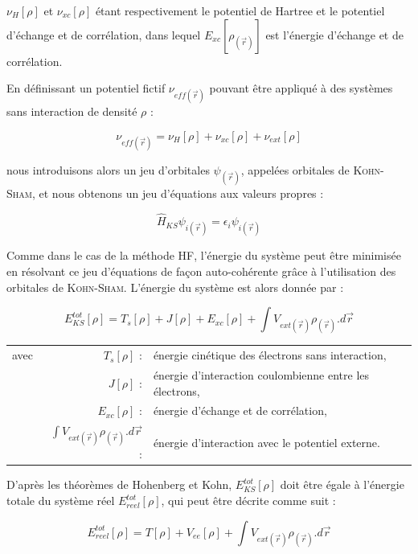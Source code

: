 \noindent $\nu_{H}[\rho]$ et $\nu_{xc}[\rho]$ étant respectivement le potentiel de Hartree et le potentiel d'échange et de corrélation, dans lequel $E_{xc}[\rho_{(\vec{r})}]$ est l'énergie d'échange et de corrélation.

En définissant un potentiel fictif $\nu_{eff(\vec{r})}$ pouvant être appliqué à des systèmes sans interaction de densité $\rho$ :

\begin{equation}
\nu_{eff(\vec{r})} = \nu_{H}[\rho] + \nu_{xc}[\rho] + \nu_{ext}[\rho]
\end{equation}

\noindent nous introduisons alors un jeu d'orbitales $\psi_{(\vec{r})}$, appelées orbitales de \textsc{Kohn-Sham}, et nous obtenons un jeu d'équations aux valeurs propres :

\begin{equation}
\hat{H}_{KS} \psi_{i(\vec{r})} = \epsilon_{i} \psi_{i(\vec{r})}
\end{equation}

Comme dans le cas de la méthode HF, l'énergie du système peut être minimisée en résolvant ce jeu d'équations de façon auto-cohérente grâce à l'utilisation des orbitales de \textsc{Kohn-Sham}. L'énergie du système est alors donnée par :

\begin{equation}
E_{KS}^{tot}[\rho] = T_{s}[\rho] + J[\rho] + E_{xc}[\rho] + \int V_{ext(\vec{r})}\rho_{(\vec{r})} .d\vec{r}
\end{equation}

\begin{flushleft}
\begin{tabular}{@{}lrp{10cm}}
avec & $T_{s}[\rho]$ : & énergie cinétique des électrons sans interaction, \\
& $J[\rho]$ : & énergie d'interaction coulombienne entre les électrons, \\
& $E_{xc}[\rho]$ : & énergie d'échange et de corrélation, \\
& $\int V_{ext(\vec{r})}\rho_{(\vec{r})} .d\vec{r}$ : & énergie d'interaction avec le potentiel externe. 
\end{tabular}
\end{flushleft}

D'après les théorèmes de Hohenberg et Kohn, $E_{KS}^{tot}[\rho]$ doit être égale à l'énergie totale du système réel $E_{reel}^{tot}[\rho]$, qui peut être décrite comme suit :

\begin{equation}
E_{reel}^{tot}[\rho] = T[\rho] + V_{ee}[\rho] + \int V_{ext(\vec{r})}\rho_{(\vec{r})} .d\vec{r}
\end{equation}

